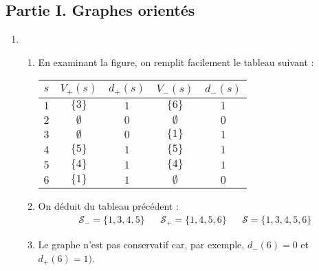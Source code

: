 \subsection*{Partie I. Graphes orientés}
\begin{enumerate}
 \item 
\begin{enumerate}
 \item En examinant la figure, on remplit facilement le tableau suivant :
\begin{center}
\renewcommand{\arraystretch}{1.3}
\begin{tabular}{|c|c|c|c|c|}\hline
$s$ & $V_+(s)$    & $d_+(s)$ & $V_-(s)$    & $d_-(s)$\\ \hline
$1$ & $\{3\}$     & $1$      & $\{6\}$     & $1$     \\ \hline
$2$ & $\emptyset$ & $0$      & $\emptyset$ & $0$     \\ \hline
$3$ & $\emptyset$ & $0$      & $\{1\}$     & $1$     \\ \hline
$4$ & $\{5\}$     & $1$      & $\{5\}$     & $1$     \\ \hline
$5$ & $\{4\}$     & $1$      & $\{4\}$     & $1$     \\ \hline
$6$ & $\{1\}$     & $1$      & $\emptyset$ & $0$     \\ \hline
\end{tabular}
\end{center}

 \item On déduit du tableau précédent :
\begin{align*}
 \mathcal{S}_-=\{1,3,4,5\} & & \mathcal{S}_+=\{1,4,5,6\} & & \mathcal{S}=\{1,3,4,5,6\} 
\end{align*}
 
 \item Le graphe n'est pas conservatif car, par exemple, $d_-(6)=0$ et $d_+(6)=1)$.
\end{enumerate}


\end{enumerate}
